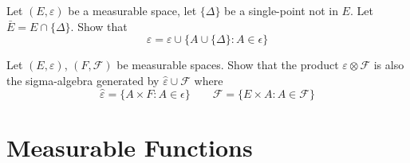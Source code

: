 \begin{problem}
	Let $(E, \varepsilon)$ be a measurable space, let $\{\Delta\}$ be a single-point not in $E$. Let $\bar E= E\cap \{\Delta\}$. Show that $$\hat \varepsilon = \varepsilon \cup \{A \cup \{\Delta\} : A\in \epsilon \}$$
\end{problem}

\fullpageboxline
\begin{problem}
	Let $(E, \varepsilon)$, $(F, \mathcal{F})$ be measurable spaces. Show that the product $\varepsilon \otimes \mathcal{F}$ is also the sigma-algebra generated by $\hat \varepsilon \cup \mathcal{F}$ where 
	\begin{equation}
		\hat \varepsilon = \{A\times F: A \in \epsilon \} \qquad \mathcal{F} = \{E\times A: A \in \mathcal{F} \}
	\end{equation}
\end{problem}

\fullpageboxline
\section{Measurable Functions}

